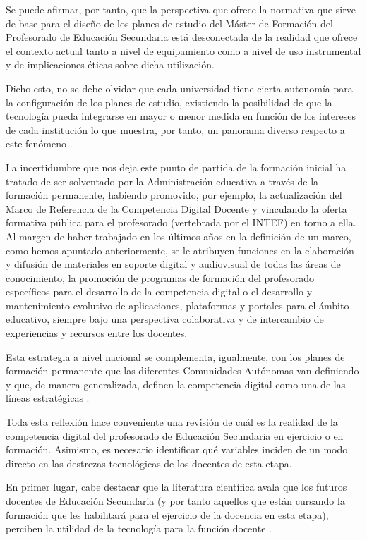 \documentclass[spanish]{textolivre}
\begin{document}
Se puede afirmar, por tanto, que la perspectiva que ofrece la normativa que sirve de base para el diseño de los planes de estudio del Máster de Formación del Profesorado de Educación Secundaria está desconectada de la realidad que ofrece el contexto actual tanto a nivel de equipamiento como a nivel de uso instrumental y de implicaciones éticas sobre dicha utilización.

Dicho esto, no se debe olvidar que cada universidad tiene cierta autonomía para la configuración de los planes de estudio, existiendo la posibilidad de que la tecnología pueda integrarse en mayor o menor medida en función de los intereses de cada institución lo que muestra, por tanto, un panorama diverso respecto a este fenómeno \cite{peirats_chacon_competencia_2018}.

La incertidumbre que nos deja este punto de partida de la formación inicial ha tratado de ser solventado por la Administración educativa a través de la formación permanente, habiendo promovido, por ejemplo, la actualización del Marco de Referencia de la Competencia Digital Docente y vinculando la oferta formativa pública para el profesorado (vertebrada por el INTEF) en torno a ella. Al margen de haber trabajado en los últimos años en la definición de un marco, como hemos apuntado anteriormente, se le atribuyen funciones en la elaboración y difusión de materiales en soporte digital y audiovisual de todas las áreas de conocimiento, la promoción de programas de formación del profesorado específicos para el desarrollo de la competencia digital o el desarrollo y mantenimiento evolutivo de aplicaciones, plataformas y portales para el ámbito educativo, siempre bajo una perspectiva colaborativa y de intercambio de experiencias y recursos entre los docentes.

Esta estrategia a nivel nacional se complementa, igualmente, con los planes de formación permanente que las diferentes Comunidades Autónomas van definiendo y que, de manera generalizada, definen la competencia digital como una de las líneas estratégicas \cite{ruizlazaro2019analisis}.

Toda esta reflexión hace conveniente una revisión de cuál es la realidad de la competencia digital del profesorado de Educación Secundaria en ejercicio o en formación. Asimismo, es necesario identificar qué variables inciden de un modo directo en las destrezas tecnológicas de los docentes de esta etapa. 

En primer lugar, cabe destacar que la literatura científica avala que los futuros docentes de Educación Secundaria (y por tanto aquellos que están cursando la formación que les habilitará para el ejercicio de la docencia en esta etapa), perciben la utilidad de la tecnología para la función docente \cite{alvarez_uria_propuesta_2022}.
\end{document}
